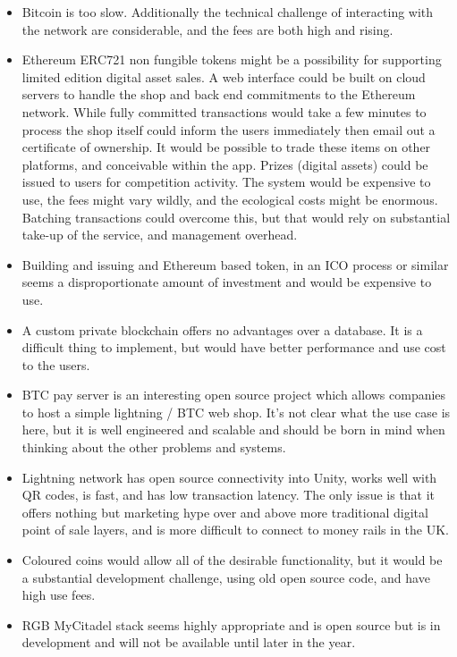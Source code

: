 \begin{itemize}
\item Bitcoin is too slow. Additionally the technical challenge of interacting with the network are considerable, and the fees are both high and rising.
\item Ethereum ERC721 non fungible tokens might be a possibility for supporting limited edition digital asset sales. A web interface could be built on cloud servers to handle the shop and back end commitments to the Ethereum network. While fully committed transactions would take a few minutes to process the shop itself could inform the users immediately then email out a certificate of ownership. It would be possible to trade these items on other platforms, and conceivable within the app. Prizes (digital assets) could be issued to users for competition activity. The system would be expensive to use, the fees might vary wildly, and the ecological costs might be enormous. Batching transactions could overcome this, but that would rely on substantial take-up of the service, and management overhead.
\item Building and issuing and Ethereum based token, in an ICO process or similar seems a disproportionate amount of investment and would be expensive to use. 
\item A custom private blockchain offers no advantages over a database. It is a difficult thing to implement, but would have better performance and use cost to the users.
\item BTC pay server is an interesting open source project which allows companies to host a simple lightning / BTC web shop. It's not clear what the use case is here, but it is well engineered and scalable and should be born in mind when thinking about the other problems and systems.
\item Lightning network has open source connectivity into Unity, works well with QR codes, is fast, and has low transaction latency. The only issue is that it offers nothing but marketing hype over and above more traditional digital point of sale layers, and is more difficult to connect to money rails in the UK.
\item Coloured coins would allow all of the desirable functionality, but it would be a substantial development challenge, using old open source code, and have high use fees. 
\item RGB MyCitadel stack seems highly appropriate and is open source but is in development and will not be available until later in the year.
\end{itemize}


